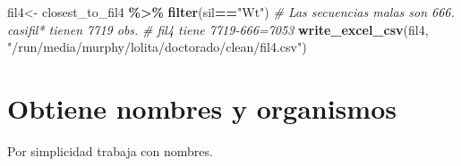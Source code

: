 \documentclass[
]{book}
\newenvironment{Shaded}{\begin{snugshade}}{\end{snugshade}}
\newcommand{\CommentTok}[1]{\textcolor[rgb]{0.56,0.35,0.01}{\textit{#1}}}
\newcommand{\KeywordTok}[1]{\textcolor[rgb]{0.13,0.29,0.53}{\textbf{#1}}}
\newcommand{\NormalTok}[1]{#1}
\newcommand{\OperatorTok}[1]{\textcolor[rgb]{0.81,0.36,0.00}{\textbf{#1}}}
\newcommand{\StringTok}[1]{\textcolor[rgb]{0.31,0.60,0.02}{#1}}
\begin{document}
\begin{Shaded}
\begin{Highlighting}[]
\NormalTok{fil4\textless{}{-}}\StringTok{ }\NormalTok{closest\_to\_fil4 }\OperatorTok{\%\textgreater{}\%}
\StringTok{  }\KeywordTok{filter}\NormalTok{(sil}\OperatorTok{==}\StringTok{"Wt"}\NormalTok{) }\CommentTok{\# Las secuencias malas son 666. casifil* tienen 7719 obs.}
\CommentTok{\# fil4 tiene 7719{-}666=7053}
\KeywordTok{write\_excel\_csv}\NormalTok{(fil4, }\StringTok{"/run/media/murphy/lolita/doctorado/clean/fil4.csv"}\NormalTok{)}
\end{Highlighting}
\end{Shaded}

\hypertarget{obtiene-nombres-y-organismos}{%
\section{Obtiene nombres y organismos}\label{obtiene-nombres-y-organismos}}

Por simplicidad trabaja con nombres.
\end{document}
